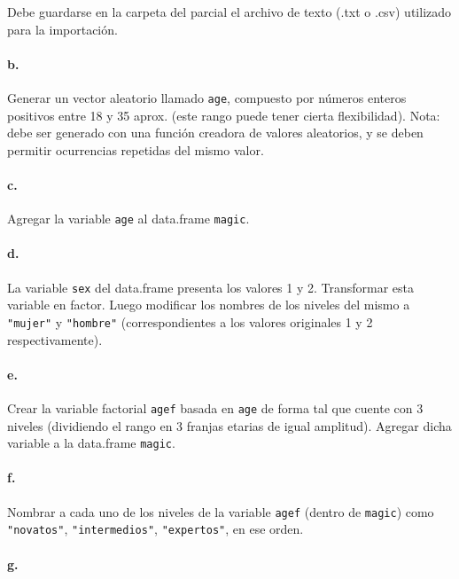 \documentclass[]{article}
\begin{document}
Debe guardarse en la carpeta del parcial el archivo de texto (.txt o
.csv) utilizado para la importación.

\paragraph{b.}

Generar un vector aleatorio llamado \texttt{age}, compuesto por números
enteros positivos entre 18 y 35 aprox. (este rango puede tener cierta
flexibilidad). Nota: debe ser generado con una función creadora de
valores aleatorios, y se deben permitir ocurrencias repetidas del mismo
valor.

\paragraph{c.}

Agregar la variable \texttt{age} al data.frame \texttt{magic}.

\paragraph{d.}

La variable \texttt{sex} del data.frame presenta los valores 1 y 2.
Transformar esta variable en factor. Luego modificar los nombres de los
niveles del mismo a \texttt{"mujer"} y \texttt{"hombre"}
(correspondientes a los valores originales 1 y 2 respectivamente).

\paragraph{e.}

Crear la variable factorial \texttt{agef} basada en \texttt{age} de
forma tal que cuente con 3 niveles (dividiendo el rango en 3 franjas
etarias de igual amplitud). Agregar dicha variable a la data.frame
\texttt{magic}.

\paragraph{f.}

Nombrar a cada uno de los niveles de la variable \texttt{agef} (dentro
de \texttt{magic}) como \texttt{"novatos"}, \texttt{"intermedios"},
\texttt{"expertos"}, en ese orden.

\paragraph{g.}
\end{document}
